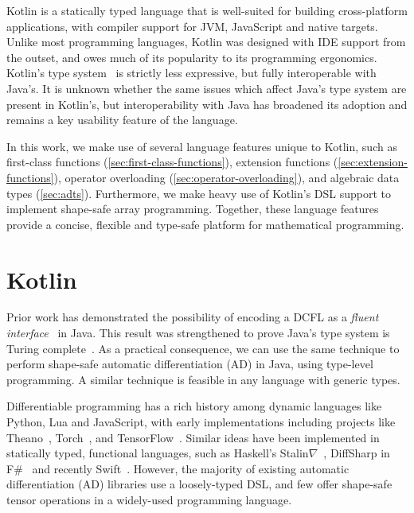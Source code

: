 \documentclass[12pt,initial,twoside,maitrise]{dms}
\numberwithin{equation}{section}
\numberwithin{table}{chapter}
\numberwithin{figure}{chapter}
\begin{document}
Kotlin is a statically typed language that is well-suited for building cross-platform applications, with compiler support for JVM, JavaScript and native targets. Unlike most programming languages, Kotlin was designed with IDE support from the outset, and owes much of its popularity to its programming ergonomics. Kotlin's type system~\citep{tate2013mixed} is strictly less expressive, but fully interoperable with Java's. It is unknown whether the same issues which affect Java's type system are present in Kotlin's, but interoperability with Java has broadened its adoption and remains a key usability feature of the language.

In this work, we make use of several language features unique to Kotlin, such as first-class functions (\autoref{sec:first-class-functions}), extension functions (\autoref{sec:extension-functions}), operator overloading (\autoref{sec:operator-overloading}), and algebraic data types (\autoref{sec:adts}). Furthermore, we make heavy use of Kotlin's DSL support to implement shape-safe array programming. Together, these language features provide a concise, flexible and type-safe platform for mathematical programming.

\section{Kotlin\textorpdfstring{$\nabla$}}\label{sec:kotlingrad}

Prior work has demonstrated the possibility of encoding a DCFL as a \textit{fluent interface}~\citep{gil2016formal, nakamaru2017silverchain} in Java. This result was strengthened to prove Java's type system is Turing complete~\citep{Grigore:2017:JGT:3009837.3009871}. As a practical consequence, we can use the same technique to perform shape-safe automatic differentiation (AD) in Java, using type-level programming. A similar technique is feasible in any language with generic types.

Differentiable programming has a rich history among dynamic languages like Python, Lua and JavaScript, with early implementations including projects like Theano~\citep{bergstra2010theano}, Torch~\citep{collobert2002torch}, and TensorFlow~\citep{abadi2016tensorflow}. Similar ideas have been implemented in statically typed, functional languages, such as Haskell's Stalin$\nabla$~\citep{pearlmutter2008using}, DiffSharp in F\#~\citep{baydin-diffsharp} and recently Swift~\citep{swift}. However, the majority of existing automatic differentiation (AD) libraries use a loosely-typed DSL, and few offer shape-safe tensor operations in a widely-used programming language.
\end{document}
